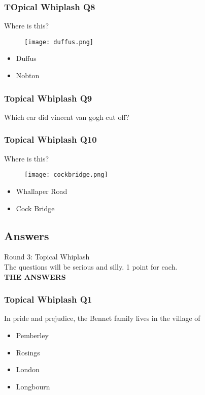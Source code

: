 \documentclass{beamer}
\begin{document}
\begin{frame}
\frametitle{TOpical Whiplash Q8}
Where is this?
\begin{figure}[H]
\texttt{[image: duffus.png]}
\end{figure}
\begin{itemize}
\item Duffus
\item Nobton
\end{itemize}


\end{frame}


\begin{frame}
\frametitle{Topical Whiplash Q9}
Which ear did vincent van gogh cut off?

\end{frame}

\begin{frame}
\frametitle{Topical Whiplash Q10}
Where is this?
\begin{figure}[H]
\texttt{[image: cockbridge.png]}
\end{figure}
\begin{itemize}
\item Whallaper Road
\item Cock Bridge
\end{itemize}


\end{frame}

\subsection{Answers}



\begin{frame}
\centering
\Huge
Round 3: Topical Whiplash\\
\small
The questions will be serious and silly. 1 point for each.\\
\textbf{THE ANSWERS}
\end{frame}

\begin{frame}
\frametitle{Topical Whiplash Q1}
In pride and prejudice, the Bennet family lives in the village of
\begin{itemize}
\item Pemberley
\item Rosings
\item London
\item Longbourn \checkmark
\end{itemize}

\end{frame}
\end{document}
